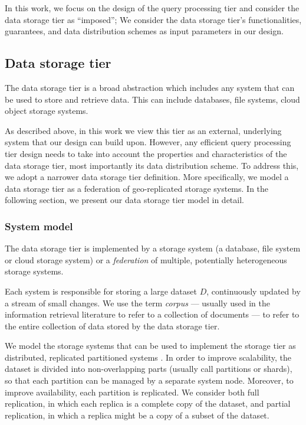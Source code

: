 In this work, we focus on the design of the query processing tier and consider the data storage tier as ``imposed'';
We consider the data storage tier's functionalities, guarantees, and data distribution schemes as input parameters in
our design.


\subsection{Data storage tier}

The data storage tier is a broad abstraction which includes any system that can be used to store and retrieve data.
This can include databases, file systems, cloud object storage systems.

As described above, in this work we view this tier as an external, underlying system that our design can build upon.
However, any efficient query processing tier design needs to take into account the properties and characteristics of the
data storage tier, most importantly its data distribution scheme.
To address this, we adopt a narrower data storage tier definition.
More specifically, we model a data storage tier as a federation of geo-replicated storage systems.
In the following section, we present our data storage tier model in detail.


\subsubsection{System model}
The data storage tier is implemented by a storage system (a database, file system or cloud storage system) or a
\textit{federation} of multiple, potentially heterogeneous storage systems.

Each system is responsible for storing a large dataset $D$, continuously updated by a stream of small changes.
We use the term \textit{corpus}  --- usually used in the information retrieval literature to refer to a collection of documents ---
to refer to the entire collection of data stored by the data storage tier.

We model the storage systems that can be used to implement the storage tier as distributed, replicated partitioned systems \cite{agrawal:taxonomy}.
In order to improve scalability, the dataset is divided into non-overlapping parts (usually call partitions or shards),
so that each partition can be managed by a separate system node.
Moreover, to improve availability, each partition is replicated.
We consider both full replication, in which each replica is a complete copy of the dataset,
and partial replication, in which a replica might be a copy of a subset of the dataset.

